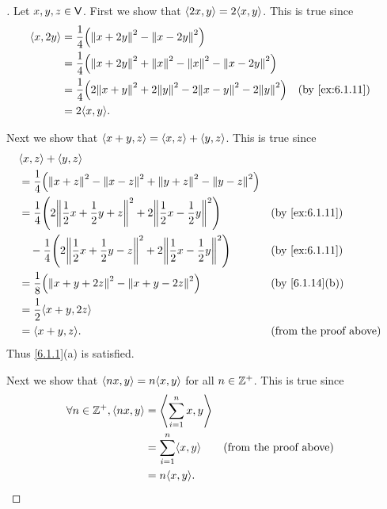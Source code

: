 \begin{proof}[]
  Let \(x, y, z \in \mathsf{V}\).
  First we show that \(\inn{2x, y} = 2 \inn{x, y}\).
  This is true since
  \begin{align*}
    \inn{x, 2y} & = \frac{1}{4} \pa{\norm{x + 2y}^2 - \norm{x - 2y}^2}                                                                   \\
                & = \frac{1}{4} \pa{\norm{x + 2y}^2 + \norm{x}^2 - \norm{x}^2 - \norm{x - 2y}^2}                                         \\
                & = \frac{1}{4} \pa{2 \norm{x + y}^2 + 2 \norm{y}^2 - 2 \norm{x - y}^2 - 2 \norm{y}^2} &  & \text{(by \cref{ex:6.1.11})} \\
                & = 2 \inn{x, y}.
  \end{align*}

  Next we show that \(\left\langle x + y, z\right\rangle = \left\langle x, z\right\rangle + \left\langle y, z\right\rangle\).
  This is true since
  \begin{align*}
     & \inn{x, z} + \inn{y, z}                                                                                                                             \\
     & = \frac{1}{4} \pa{\norm{x + z}^2 - \norm{x - z}^2 + \norm{y + z}^2 - \norm{y - z}^2}                                                                \\
     & = \frac{1}{4} \pa{2 \norm{\frac{1}{2} x + \frac{1}{2} y + z}^2 + 2 \norm{\frac{1}{2} x - \frac{1}{2} y}^2}       &  & \text{(by \cref{ex:6.1.11})}  \\
     & \quad - \frac{1}{4} \pa{2 \norm{\frac{1}{2} x + \frac{1}{2} y - z}^2 + 2 \norm{\frac{1}{2} x - \frac{1}{2} y}^2} &  & \text{(by \cref{ex:6.1.11})}  \\
     & = \frac{1}{8} \pa{\norm{x + y + 2z}^2 - \norm{x + y - 2z}^2}                                                     &  & \text{(by \cref{6.1.14}(b))}  \\
     & = \frac{1}{2} \inn{x + y, 2z}                                                                                                                       \\
     & = \inn{x + y, z}.                                                                                                &  & \text{(from the proof above)}
  \end{align*}
  Thus \cref{6.1.1}(a) is satisfied.

  Next we show that \(\inn{nx, y} = n \inn{x, y}\) for all \(n \in \mathbb{Z}^+\).
  This is true since
  \begin{align*}
    \forall n \in \Z^+, \inn{nx, y} & = \inn{\sum_{i = 1}^n x, y}                                    \\
                                    & = \sum_{i = 1}^n \inn{x, y} &  & \text{(from the proof above)} \\
                                    & = n \inn{x, y}.
  \end{align*}


\end{proof}
